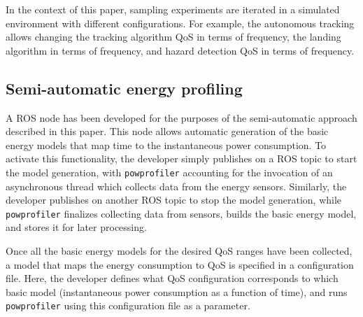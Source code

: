 \documentclass[conference]{IEEEtran}
\newcommand{\stt}[1]{{\small\tt #1}} %
\newcommand{\powprof}{\stt{powprofiler}}
\begin{document}
In the context of this paper, sampling experiments are iterated in a
simulated environment with different configurations.  For example, the
autonomous tracking allows changing the tracking algorithm QoS in
terms of frequency, the landing algorithm in terms of frequency, and
hazard detection QoS in terms of frequency.
%


\subsection{Semi-automatic energy profiling}
\label{sec:semi-automatic}


%
A ROS node has been developed for the purposes of the semi-automatic %
approach described in this paper. This node allows automatic
generation of the basic energy models that map time to the
instantaneous power consumption. To activate this functionality, the developer simply publishes on a ROS
topic to start the model generation, with \powprof{} accounting for
the invocation of an asynchronous thread which collects data from the
energy sensors. Similarly, the developer publishes on another ROS topic to
stop the model generation, while \powprof{} finalizes collecting data from
sensors, builds the basic energy model, and stores it for later processing.


Once all the basic energy models for the desired QoS ranges have been
collected, a model that maps the energy consumption to QoS
is specified in a configuration file. Here, the developer defines
what QoS configuration corresponds to which basic model
(instantaneous power consumption as a function of time), and runs
\powprof{} using this configuration file as a parameter.
%
\end{document}
